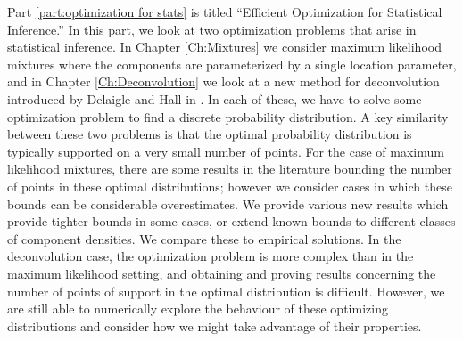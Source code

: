 Part \ref{part:optimization for stats} is titled ``Efficient Optimization for Statistical Inference.'' In this part, we look at two optimization problems that arise in statistical inference. In Chapter \ref{Ch:Mixtures} we consider maximum likelihood mixtures where the components are parameterized by a single location parameter, and in Chapter \ref{Ch:Deconvolution} we look at a new method for deconvolution introduced by Delaigle and Hall in \cite{Delaigle2016-la}. In each of these, we have to solve some optimization problem to find a discrete probability distribution. A key similarity between these two problems is that the optimal probability distribution is typically supported on a very small number of points. 
For the case of maximum likelihood mixtures, there are some results in the literature bounding the number of points in these optimal distributions; however we consider cases in which these bounds can be considerable overestimates. We provide various new results which provide tighter bounds in some cases, or extend known bounds to different classes of component densities. We compare these to empirical solutions.
In the deconvolution case, the optimization problem is more complex than in the maximum likelihood setting, and obtaining and proving results concerning the number of points of support in the optimal distribution is difficult. However, we are still able to numerically explore the behaviour of these optimizing distributions and consider how we might take advantage of their properties.
